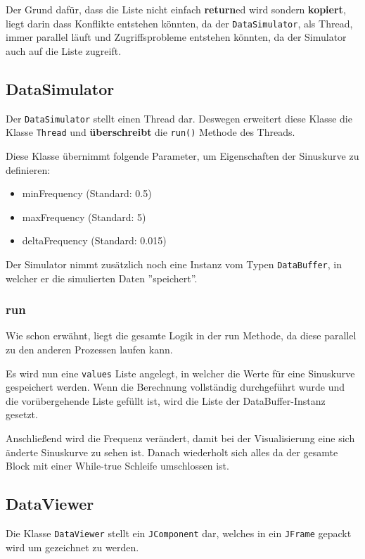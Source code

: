 Der Grund dafür, dass die Liste nicht einfach \textbf{return}ed wird sondern \textbf{kopiert}, liegt darin dass Konflikte entstehen könnten, da der \verb|DataSimulator|, als Thread,  immer parallel läuft und Zugriffsprobleme entstehen könnten, da der Simulator auch auf die Liste zugreift.



\subsection{DataSimulator}
Der \verb|DataSimulator| stellt einen Thread dar. Deswegen erweitert diese Klasse die Klasse \verb|Thread| und \textbf{überschreibt} die \verb|run()| Methode des Threads.

Diese Klasse übernimmt folgende Parameter, um Eigenschaften der Sinuskurve zu definieren:

\begin{itemize}
	\item minFrequency (Standard: 0.5)
	\item maxFrequency (Standard: 5)
	\item deltaFrequency (Standard: 0.015)
\end{itemize}

Der Simulator nimmt zusätzlich noch eine Instanz vom Typen \verb|DataBuffer|, in welcher er die simulierten Daten ''speichert''.

\subsubsection{run}
Wie schon erwähnt, liegt die gesamte Logik in der run Methode, da diese parallel zu den anderen Prozessen laufen kann.

Es wird nun eine \verb|values| Liste angelegt, in welcher die Werte für eine Sinuskurve gespeichert werden. Wenn die Berechnung vollständig durchgeführt wurde und die vorübergehende Liste gefüllt ist, wird die Liste der DataBuffer-Instanz gesetzt.

Anschließend wird die Frequenz verändert, damit bei der Visualisierung eine sich änderte Sinuskurve zu sehen ist. Danach wiederholt sich alles da der gesamte Block mit einer While-true Schleife umschlossen ist.

\clearpage

\subsection{DataViewer}
Die Klasse \verb|DataViewer| stellt ein \verb|JComponent| dar, welches in ein \verb|JFrame| gepackt wird um gezeichnet zu werden.

